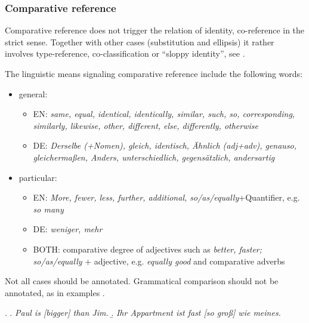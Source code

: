 \documentclass[a4paper]{article}
\begin{document}
{{%


\subsubsection{Comparative reference}\label{comp}

Comparative reference does not trigger the relation of identity, co-reference in the strict sense. Together with other cases (substitution and ellipsis) it rather involves type-reference, co-classification or ``sloppy identity'', see \cite{KunzSteiner2012}.

The linguistic means signaling comparative reference include the following words: 

\begin{itemize}
\item general: 
\begin{itemize}
\item EN: {\sl same, equal, identical, identically, similar, such, so, corresponding, similarly, likewise, other, different, else,
differently, otherwise}
\item DE: {\sl Derselbe (+Nomen), gleich, identisch, Ähnlich (adj+adv), genauso, gleichermaßen, Anders, unterschiedlich, gegensätzlich, andersartig}
\end{itemize}
\item particular:

\begin{itemize}
\item EN: {\sl More, fewer, less, further, additional, so/as/equally}+Quantifier, e.g. {\sl so many}
\item DE: {\sl weniger, mehr}
\item BOTH: comparative degree of adjectives such as {\sl better, faster; so/as/equally} + 
adjective, e.g. {\sl equally good} and comparative adverbs
\end{itemize}
\end{itemize}

Not all cases should be annotated. %
Grammatical comparison should not be annotated, as in examples \Next[a-b].

\ex.
\a. {\sl Paul is [bigger] than Jim.}
\b. {\sl Ihr Appartment ist fast [so groß] wie meines.}

}}
\end{document}
